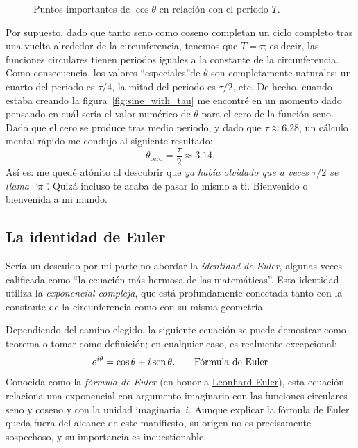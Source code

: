 \begin{figure}
\begin{center}
\end{center}
\caption{Puntos importantes de $\cos\theta$ en relación con el periodo $T$.\label{fig:cosine_with_tau}}
\end{figure}


Por supuesto, dado que tanto seno como coseno completan un ciclo completo tras una vuelta alrededor de la circunferencia, tenemos que $T = \tau$; es decir, las funciones circulares tienen periodos iguales a la constante de la circunferencia. Como consecuencia, los valores ``especiales''de $\theta$ son completamente naturales: un cuarto del periodo es $\tau/4$, la mitad del periodo es $\tau/2$, etc. De hecho, cuando estaba creando la figura~\ref{fig:sine_with_tau} me encontré en un momento dado pensando en cuál sería el valor numérico de $\theta$ para el cero de la función seno. Dado que el cero se produce tras medio periodo, y dado que $\tau \approx 6.28$, un cálculo mental rápido me condujo al siguiente resultado:
\[
  \theta_\mathrm{cero} = \frac{\tau}{2} \approx 3.14.
\]
Así es: me quedé atónito al descubrir que \emph{ya había olvidado que a veces $\tau/2$ se llama ``$\pi$''.} Quizá incluso te acaba de pasar lo mismo a ti. Bienvenido o bienvenida a mi mundo.



   \subsection{La identidad de Euler} %
   \label{sec:euler_s_identity}

Sería un descuido por mi parte no abordar la \emph{identidad de Euler}, algunas veces calificada como ``la ecuación más hermosa de las matemáticas''. Esta identidad utiliza la \emph{exponencial compleja}, que está profundamente conectada tanto con la constante de la circunferencia como con su misma geometría.

Dependiendo del camino elegido, la siguiente ecuación se puede demostrar como teorema o tomar como definición; en cualquier caso, es realmente excepcional:
\begin{equation}
\label{eq:eulers_formula}
e^{i\theta} = \cos\theta + i\,\mbox{sen}\,\theta. \qquad\mbox{Fórmula de Euler}
\end{equation}
Conocida como la \emph{fórmula de Euler} (en honor a \href{https://es.wikipedia.org/wiki/Leonhard_Euler}{Leonhard Euler}), esta ecuación relaciona una exponencial con argumento imaginario con las funciones circulares seno y coseno y con la unidad imaginaria~$i$. Aunque explicar la fórmula de Euler queda fuera del alcance de este manifiesto, su origen no es precisamente sospechoso, y su importancia es incuestionable.

